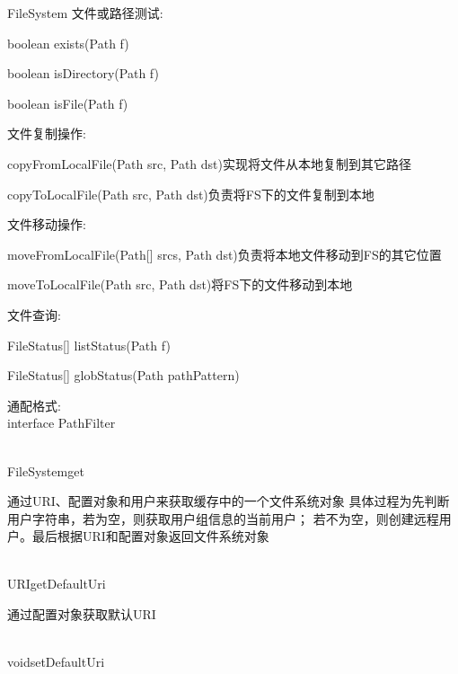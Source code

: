 \begin{XeClass}{FileSystem}
 文件或路径测试: \\
 \begin{XeEnum}
 \item boolean exists(Path f)
 \item boolean isDirectory(Path f)
 \item boolean isFile(Path f)
 \end{XeEnum}
 
 文件复制操作:
 \begin{XeEnum}
 \item copyFromLocalFile(Path src, Path dst)实现将文件从本地复制到其它路径
 \item copyToLocalFile(Path src, Path dst)负责将FS下的文件复制到本地
 \end{XeEnum}
 
 文件移动操作: \\
 \begin{XeEnum}
 \item moveFromLocalFile(Path[] srcs, Path dst)负责将本地文件移动到FS的其它位置
 \item moveToLocalFile(Path src, Path dst)将FS下的文件移动到本地
 \end{XeEnum}
  
 文件查询: \\
 \begin{XeEnum}
 \item FileStatus[] listStatus(Path f)
 \item FileStatus[] globStatus(Path pathPattern)
 \end{XeEnum}
  
 通配格式: \\
 interface PathFilter

  \begin{XeMethod}{\XePublic\\ }{FileSystem}{get}
       
 通过URI、配置对象和用户来获取缓存中的一个文件系统对象
 具体过程为先判断用户字符串，若为空，则获取用户组信息的当前用户；
 若不为空，则创建远程用户。最后根据URI和配置对象返回文件系统对象

  \end{XeMethod}

  \begin{XeMethod}{\XePublic\\ }{URI}{getDefaultUri}
       
 通过配置对象获取默认URI

  \end{XeMethod}

  \begin{XeMethod}{\XePublic\\ }{void}{setDefaultUri}
       

\end{XeMethod}
\end{XeClass}
